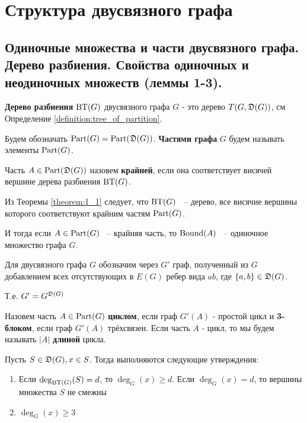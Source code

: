 \newpage

\section{Структура двусвязного графа}

\subsection{Одиночные множества и части двусвязного графа. Дерево разбиения. Свойства одиночных и неодиночных множеств (леммы 1-3).}


\begin{df*}
	\textbf{Дерево разбиения} $\operatorname{BT}(G)$ двусвязного графа  $G$ - это дерево  $T(G, \mathfrak{D}(G))$, см Определение \ref{definition:tree_of_partition}.

	Будем обозначать $\operatorname{Part}(G) = \operatorname{Part}(\mathfrak{D}(G))$.
	\textbf{Частями графа}  $G$ будем называть элементы  $\operatorname{Part}(G)$.
\end{df*}

\begin{df*}
	Часть $A \in \operatorname{Part}(\mathfrak{D}(G))$ назовем \textbf{крайней}, если она соответствует висячей вершине дерева разбиения  $\operatorname{BT}(G)$.
\end{df*}

Из Теоремы \ref{theorem:1_1} следует, что $\operatorname{BT}(G)$ ~-- дерево, все висячие вершины которого соответствуют крайним частям $\operatorname{Part}(G)$.

И тогда если $A \in \operatorname{Part}(G)$ ~-- крайняя часть, то $\operatorname{Bound}(A)$ ~-- одиночное множество графа $G$.

\begin{df*}[$G'$]
	Для двусвязного графа $G$ обозначим через $G'$ граф, полученный из $G$ добавлением всех отсутствующих в $E(G)$ ребер вида $ab$, где $\{a, b\} \in \mathfrak{D}(G)$.

	Т.е. $G' = G^{\mathfrak{D}(G)}$
\end{df*}

\begin{df*}
	Назовем часть $A \in \operatorname{Part}(G)$ \textbf{циклом}, если граф $G'(A)$ - простой цикл и \textbf{3-блоком}, если граф $G'(A)$ трёхсвязен.
	Если часть $A$ - цикл, то мы будем называть $|A|$ \textbf{длиной} цикла.
\end{df*}

\begin{customlm}{2.1} \label{lemma:2_1}
	Пусть $S \in \mathfrak{D}(G), x \in S$.
	Тогда выполняются следующие утверждения:
	 \begin{enumerate}
	\item Если $\deg_{\operatorname{BT}(G)}(S) = d$, то  $\deg_G(x) \geqslant d$.
		 Если  $\deg_G(x) = d$, то вершины множества  $S$ не смежны
	 \item $\deg_G(x) \geqslant 3$
	\end{enumerate}
\end{customlm}

